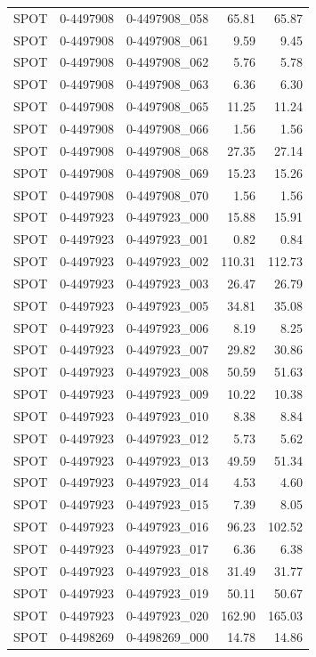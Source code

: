 \begin{tabular}{lllrr}
SPOT & 0-4497908 & 0-4497908_058 & 65.81 & 65.87 \\
SPOT & 0-4497908 & 0-4497908_061 & 9.59 & 9.45 \\
SPOT & 0-4497908 & 0-4497908_062 & 5.76 & 5.78 \\
SPOT & 0-4497908 & 0-4497908_063 & 6.36 & 6.30 \\
SPOT & 0-4497908 & 0-4497908_065 & 11.25 & 11.24 \\
SPOT & 0-4497908 & 0-4497908_066 & 1.56 & 1.56 \\
SPOT & 0-4497908 & 0-4497908_068 & 27.35 & 27.14 \\
SPOT & 0-4497908 & 0-4497908_069 & 15.23 & 15.26 \\
SPOT & 0-4497908 & 0-4497908_070 & 1.56 & 1.56 \\
SPOT & 0-4497923 & 0-4497923_000 & 15.88 & 15.91 \\
SPOT & 0-4497923 & 0-4497923_001 & 0.82 & 0.84 \\
SPOT & 0-4497923 & 0-4497923_002 & 110.31 & 112.73 \\
SPOT & 0-4497923 & 0-4497923_003 & 26.47 & 26.79 \\
SPOT & 0-4497923 & 0-4497923_005 & 34.81 & 35.08 \\
SPOT & 0-4497923 & 0-4497923_006 & 8.19 & 8.25 \\
SPOT & 0-4497923 & 0-4497923_007 & 29.82 & 30.86 \\
SPOT & 0-4497923 & 0-4497923_008 & 50.59 & 51.63 \\
SPOT & 0-4497923 & 0-4497923_009 & 10.22 & 10.38 \\
SPOT & 0-4497923 & 0-4497923_010 & 8.38 & 8.84 \\
SPOT & 0-4497923 & 0-4497923_012 & 5.73 & 5.62 \\
SPOT & 0-4497923 & 0-4497923_013 & 49.59 & 51.34 \\
SPOT & 0-4497923 & 0-4497923_014 & 4.53 & 4.60 \\
SPOT & 0-4497923 & 0-4497923_015 & 7.39 & 8.05 \\
SPOT & 0-4497923 & 0-4497923_016 & 96.23 & 102.52 \\
SPOT & 0-4497923 & 0-4497923_017 & 6.36 & 6.38 \\
SPOT & 0-4497923 & 0-4497923_018 & 31.49 & 31.77 \\
SPOT & 0-4497923 & 0-4497923_019 & 50.11 & 50.67 \\
SPOT & 0-4497923 & 0-4497923_020 & 162.90 & 165.03 \\
SPOT & 0-4498269 & 0-4498269_000 & 14.78 & 14.86 \\

\end{tabular}
